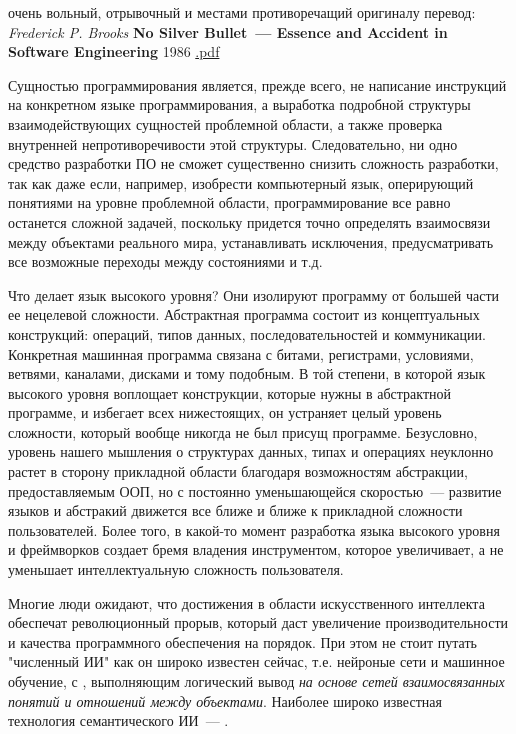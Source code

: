 
\noindent
очень вольный, отрывочный и местами противоречащий оригиналу перевод: 
\textit{Frederick P. Brooks} \textbf{No Silver Bullet\ --- Essence and Accident
in Software Engineering} 1986
\href{http://worrydream.com/refs/Brooks-NoSilverBullet.pdf}{.pdf}
\bigskip

Сущностью программирования является, прежде всего, не написание инструкций на
конкретном языке программирования, а выработка подробной структуры
взаимодействующих сущностей проблемной области, а также проверка внутренней
непротиворечивости этой структуры.
Следовательно, ни одно средство разработки ПО не сможет существенно снизить
сложность разработки, так как даже если, например, изобрести компьютерный язык,
оперирующий понятиями на уровне проблемной области, программирование все равно
останется сложной задачей, поскольку придется точно определять взаимосвязи между
объектами реального мира, устанавливать исключения, предусматривать все
возможные переходы между состояниями и т.д.

Что делает язык высокого уровня? Они изолируют программу от большей части ее
нецелевой сложности. Абстрактная программа состоит из концептуальных
конструкций: операций, типов данных, последовательностей и коммуникации.
Конкретная машинная программа связана с битами, регистрами, условиями, ветвями,
каналами, дисками и тому подобным. В той степени, в которой язык высокого уровня
воплощает конструкции, которые нужны в абстрактной программе, и избегает всех
нижестоящих, он устраняет целый уровень сложности, который вообще никогда не был
присущ программе. Безусловно, уровень нашего мышления о структурах данных, типах
и операциях неуклонно растет в сторону прикладной области благодаря
возможностям абстракции, предоставляемым ООП, но с постоянно уменьшающейся
скоростью\ --- развитие языков и абстракий движется все ближе и ближе к
прикладной сложности пользователей. Более того, в какой-то момент разработка
языка высокого уровня и фреймворков создает бремя владения инструментом, которое
увеличивает, а не уменьшает интеллектуальную сложность пользователя.

Многие люди ожидают, что достижения в области искусственного интеллекта
обеспечат революционный прорыв, который даст увеличение производительности и
качества программного обеспечения на порядок. При этом не стоит путать
"численный ИИ" как он широко известен сейчас, т.е. нейроные сети и машинное
обучение, с , выполняющим логический вывод \emph{на
основе сетей взаимосвязанных понятий и отношений между объектами}. Наиболее
широко известная технология семантического ИИ\ --- .

